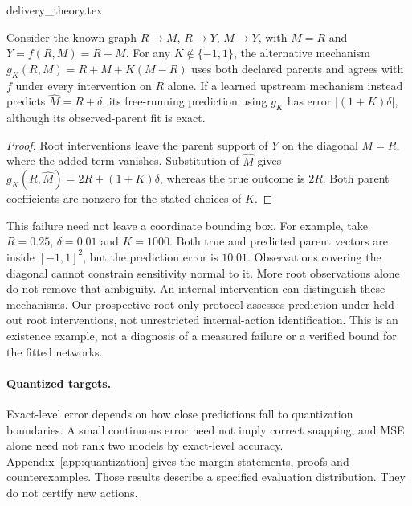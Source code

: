 \begin{filecontents*}[overwrite]{delivery_theory.tex}
\begin{proposition}
Consider the known graph $R\to M$, $R\to Y$, $M\to Y$, with
$M=R$ and $Y=f(R,M)=R+M$. For any $K\notin\{-1,1\}$, the alternative
mechanism $g_K(R,M)=R+M+K(M-R)$ uses both declared parents and agrees with
$f$ under every intervention on $R$ alone. If a learned upstream mechanism
instead predicts $\hat M=R+\delta$, its free-running prediction using $g_K$
has error $|(1+K)\delta|$, although its observed-parent fit is exact.
\end{proposition}
\begin{proof}
Root interventions leave the parent support of $Y$ on the diagonal $M=R$,
where the added term vanishes. Substitution of $\hat M$ gives
$g_K(R,\hat M)=2R+(1+K)\delta$, whereas the true outcome is $2R$.
Both parent coefficients are nonzero for the stated choices of $K$.
\end{proof}
This failure need not leave a coordinate bounding box. For example, take
$R=0.25$, $\delta=0.01$ and $K=1000$. Both true and predicted parent vectors
are inside $[-1,1]^2$, but the prediction error is $10.01$. Observations
covering the diagonal cannot constrain sensitivity normal to it. More root
observations alone do not remove that ambiguity. An internal intervention can
distinguish these mechanisms. Our prospective root-only protocol assesses
prediction under held-out root interventions, not unrestricted internal-action
identification. This is an existence example, not a diagnosis of a measured
failure or a verified bound for the fitted networks.

\paragraph{Quantized targets.}
Exact-level error depends on how close predictions fall to quantization
boundaries. A small continuous error need not imply correct snapping, and MSE
alone need not rank two models by exact-level accuracy. Appendix~\ref{app:quantization}
gives the margin statements, proofs and counterexamples. Those results describe
a specified evaluation distribution. They do not certify new actions.
\end{filecontents*}
